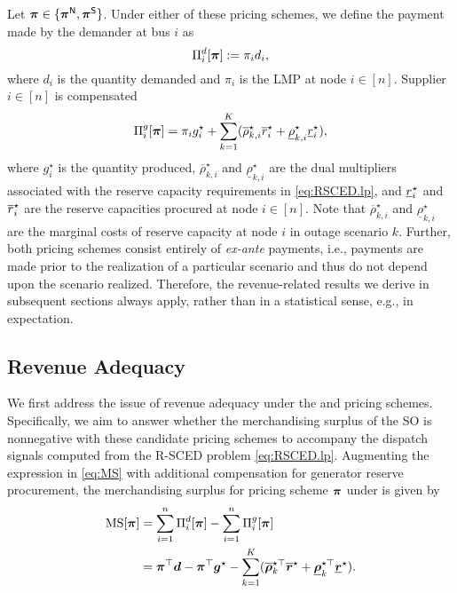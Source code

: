Let ${\bm{\pi}}\in\{{\bm{\pi}}^{{\sf N}},{\bm{\pi}}^{{\sf S}}\}$. Under either of these pricing schemes, we define the payment made by the demander at bus $i$ as 
$$\Pi^d_i[{\bm{\pi}}] := \pi_i d_i,$$ where $d_i$ is the quantity demanded and $\pi_i$ is the LMP at node $i\in[n]$. Supplier $i\in[n]$ is compensated 
\begin{equation}\label{eq:supp_comp}
    \Pi^g_i[{\bm{\pi}}] = \pi_i g^{\star}_i + \sum_{k=1}^K(\overline{\rho}^{\star}_{k,i}\overline{r}^{\star}_i + \underline{\rho}^{\star}_{k,i} \underline{r}^{\star}_i),
\end{equation} where $g^{\star}_i$ is the quantity produced, $\overline{\rho}^{\star}_{k,i}$ and $\underline{\rho}^{\star}_{k,i}$ are the dual multipliers associated with the reserve capacity requirements in \eqref{eq:RSCED.lp}, and $\underline{{r}}^{\star}_i$ and $\overline{{r}}^{\star}_i$ are the reserve capacities procured at node $i\in[n]$. Note that $\overline{\rho}^{\star}_{k,i}$ and $\underline{\rho}^{\star}_{k,i}$ are the marginal costs of reserve capacity at node $i$ in outage scenario $k$. Further, both pricing schemes consist entirely of \emph{ex-ante} payments, i.e., payments are made prior to the realization of a particular scenario and thus do not depend upon the scenario realized. Therefore, the revenue-related results we derive in subsequent sections always apply, rather than in a statistical sense, e.g., in expectation.

\subsection{Revenue Adequacy} %
\label{sub:revenue_adequacy}

We first address the issue of revenue adequacy under the \LMPnom{} and \LMPmar{} pricing schemes. Specifically, we aim to answer whether the merchandising surplus of the SO is nonnegative with these candidate pricing schemes to accompany the dispatch signals computed from the R-SCED problem \eqref{eq:RSCED.lp}. 
Augmenting the expression in \eqref{eq:MS} with additional compensation for generator reserve procurement, the merchandising surplus for pricing scheme ${\bm{\pi}}$ under \RSCED{} is given by
\begin{equation}\label{eq:MS_RSCED}
\begin{split}
    {\rm MS}{}[{\bm{\pi}}] &= \sum_{i=1}^n\Pi^d_i[{\bm{\pi}}] - \sum_{i=1}^n\Pi^g_i[{\bm{\pi}}]\\
    &= {\bm{\pi}}^\top {\bm{d}} - {\bm{\pi}}^\top {\bm{g}}^{\star} - \sum_{k=1}^K(\overline{{\bm{\rho}}}_k^{\star\top} \overline{{\bm{r}}}^{\star} + \underline{{\bm{\rho}}}^{\star\top}_k \underline{{\bm{r}}}^{\star}).
\end{split}
\end{equation}

